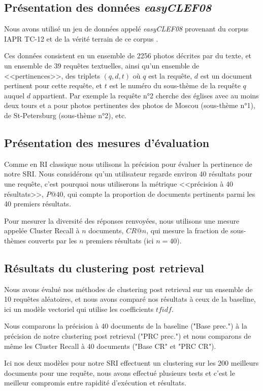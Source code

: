 \documentclass{article}
\begin{document}
\subsection{Présentation des données \textit{easyCLEF08}}
Nous avons utilisé un jeu de données appelé \textit{easyCLEF08} provenant du corpus IAPR TC-12 \cite{grubinger06} et de la vérité terrain de ce corpus \cite{arni08}. 

Ces données consistent en un ensemble de 2256 photos décrites par du texte, et un ensemble de 39 requêtes textuelles, ainsi qu'un ensemble de <<pertinences>>, des triplets $(q,d,t)$ où $q$ est la requête, $d$ est un document pertinent pour cette requête, et $t$ est le numéro du sous-thème de la requête $q$ auquel $d$ appartient.
Par exemple la requête n°2 cherche des églises avec au moins deux tours et a pour photos pertinentes des photos de Moscou (sous-thème n°1), de St-Petersburg (sous-thème n°2), etc.

\subsection{Présentation des mesures d'évaluation}
Comme en RI classique nous utilisons la précision pour évaluer la pertinence de notre SRI. Nous considérons qu'un utilisateur regarde environ 40 résultats pour une requête, c'est pourquoi nous utiliserons la métrique <<précision à 40 résultats>>, $P@40$, qui compte la proportion de documents pertinents parmi les 40 premiers résultats.

Pour mesurer la diversité des réponses renvoyées, nous utilisons une mesure appelée Cluster Recall à $n$ documents, $CR@n$, qui mesure la fraction de sous-thèmes couverts par les $n$ premiers résultats (ici $n=40$).


\subsection{Résultats du clustering post retrieval}
Nous avons évalué nos méthodes de clustering post retrieval sur un ensemble de 10 requêtes aléatoires, et nous avons comparé nos résultats à ceux de la baseline, ici un modèle vectoriel qui utilise les coefficients $tfidf$.

Nous comparons la précision à 40 documents de la baseline ("Base prec.") à la précision de notre clustering post retrieval ("PRC prec.") et nous comparons de même les Cluster Recall à 40 documents ("Base CR" et "PRC CR").

Ici nos deux modèles pour notre SRI effectuent un clustering sur les 200 meilleurs documents pour une requête, nous avons effectué plusieurs tests et c'est le meilleur compromis entre rapidité d'exécution et résultats.
\end{document}
